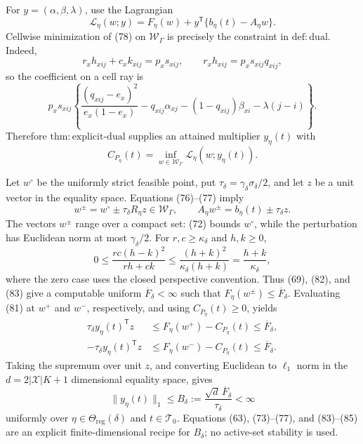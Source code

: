 For \(y=(\alpha,\beta,\lambda)\), use the Lagrangian
\[
\mathcal L_\eta(w;y)
=F_\eta(w)+y^{\mathsf T}\{b_\eta(t)-A_\eta w\}.
\tag{78}
\]
Cellwise minimization of (78) on \(\mathcal W_\Gamma\) is precisely the constraint in \(\mathrm{def{:}dual}\).  Indeed,
\[
r_xh_{xij}+c_xk_{xij}=p_xs_{xij},
\qquad
r_xh_{xij}=p_xs_{xij}q_{xij},
\tag{79}
\]
so the coefficient on a cell ray is
\[
p_xs_{xij}\left\{
\frac{(q_{xij}-e_x)^2}{e_x(1-e_x)}
-q_{xij}\alpha_{xj}-(1-q_{xij})\beta_{xi}
-\lambda(j-i)\right\}.
\tag{80}
\]
Therefore \(\mathrm{thm{:}explicit\mbox{-}dual}\) supplies an attained multiplier \(y_\eta(t)\) with
\[
C_{P_\eta}(t)
=\inf_{w\in\mathcal W_\Gamma}
\mathcal L_\eta(w;y_\eta(t)).
\tag{81}
\]

Let \(w^\circ\) be the uniformly strict feasible point, put
\(
\tau_\delta=\gamma_\delta\sigma_\delta/2
\), and let \(z\) be a unit vector in the equality space.  Equations (76)--(77) imply
\[
w^\pm=w^\circ\pm\tau_\delta R_\eta z\in\mathcal W_\Gamma,
\qquad
A_\eta w^\pm=b_\eta(t)\pm\tau_\delta z.
\tag{82}
\]
The vectors \(w^\pm\) range over a compact set: (72) bounds \(w^\circ\), while the perturbation has Euclidean norm at most \(\gamma_\delta/2\).  For \(r,c\geq\kappa_\delta\) and \(h,k\geq0\),
\[
0\leq\frac{rc(h-k)^2}{rh+ck}
\leq\frac{(h+k)^2}{\kappa_\delta(h+k)}
=\frac{h+k}{\kappa_\delta},
\tag{83}
\]
where the zero case uses the closed perspective convention.  Thus (69), (82), and (83) give a computable uniform \(\overline F_\delta<\infty\) such that \(F_\eta(w^\pm)\leq\overline F_\delta\).  Evaluating (81) at \(w^+\) and \(w^-\), respectively, and using \(C_{P_\eta}(t)\geq0\), yields
\[
\begin{aligned}
\tau_\delta y_\eta(t)^{\mathsf T}z
&\leq F_\eta(w^+)-C_{P_\eta}(t)\leq\overline F_\delta,\\
-\tau_\delta y_\eta(t)^{\mathsf T}z
&\leq F_\eta(w^-)-C_{P_\eta}(t)\leq\overline F_\delta.
\end{aligned}
\tag{84}
\]
Taking the supremum over unit \(z\), and converting Euclidean to \(\ell_1\) norm in the \(d=2|\mathcal X|K+1\) dimensional equality space, gives
\[
\|y_\eta(t)\|_1
\leq B_\delta
:=\frac{\sqrt d\,\overline F_\delta}{\tau_\delta}<\infty
\tag{85}
\]
uniformly over \(\eta\in\Theta_{\mathrm{reg}}(\delta)\) and \(t\in\mathcal T_0\).  Equations (63), (73)--(77), and (83)--(85) are an explicit finite-dimensional recipe for \(B_\delta\); no active-set stability is used.

